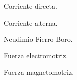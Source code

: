 \begin{description}
\item{} Corriente directa.
\item{} Corriente alterna.
\item{} Neudimio-Fierro-Boro.
\item{} Fuerza electromotriz.
\item{} Fuerza magnetomotriz.
\end{description}